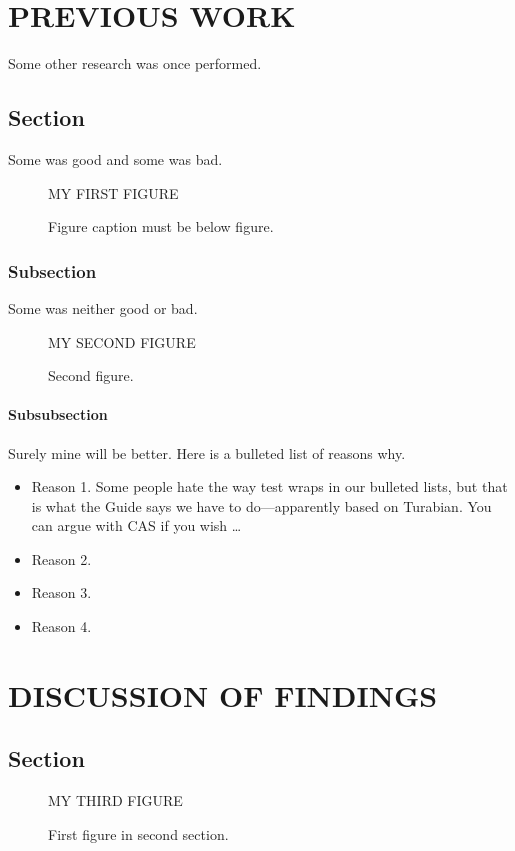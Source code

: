 \documentclass[12pt,econ]{sources/authesis}
\theoremstyle{definition}
\theoremstyle{definition}
\theoremstyle{definition}
\theoremstyle{remark}
\begin{document}
\chapter{PREVIOUS WORK}\label{previous-work}

Some other research was once performed.

\section{Section}\label{section}

Some was good and some was bad.
\begin{figure}
\centering MY FIRST FIGURE
\caption{Figure caption must be below figure.}
\end{figure}
\subsection{Subsection}\label{subsection}

Some was neither good or bad.
\begin{figure}
\centering MY SECOND FIGURE
\caption{Second figure.}
\end{figure}
\subsubsection{Subsubsection}\label{subsubsection}

Surely mine will be better. Here is a bulleted list of reasons why.
\begin{itemize}
\item Reason 1.
Some people hate the way test wraps in our bulleted lists,
but that is what the Guide says we have to do---apparently based on Turabian.
You can argue with CAS if you wish \dots
\item Reason 2.
\item Reason 3.
\item Reason 4.
\end{itemize}
\chapter{DISCUSSION OF FINDINGS}\label{discussion-of-findings}

\section{Section}\label{section-1}
\begin{figure}
\centering MY THIRD FIGURE
\caption{First figure in second section.}
\end{figure}
\end{document}
